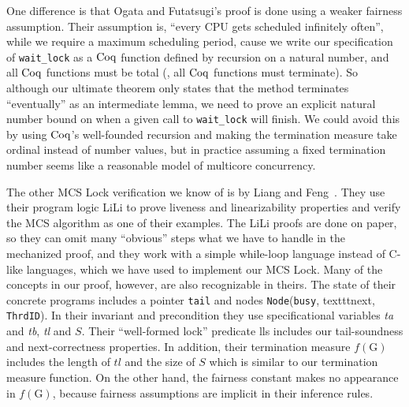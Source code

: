One difference is that Ogata and Futatsugi's proof is
done using a weaker fairness assumption.
Their assumption is, ``every CPU gets
scheduled infinitely often'', while we require a maximum scheduling
period,  cause we write our specification of \lstinline$wait_lock$ as a $\mathrm{Coq}$ function defined by recursion on a natural number, and all $\mathrm{Coq}$ functions must be total (\ie, all $\mathrm{Coq}$ functions must terminate). 
So although our ultimate theorem only states that the method
terminates ``eventually'' as an intermediate lemma, we need to prove an explicit natural number bound on when a given call to
\lstinline$wait_lock$ will finish.  
We could avoid this by using
$\mathrm{Coq}$'s well-founded recursion and
making the termination measure take ordinal instead of number
values, but in practice assuming a fixed termination number seems like a reasonable
model of multicore concurrency.

The other MCS Lock verification we know of is by Liang and
Feng~\cite{lili16}. 
They use their program logic LiLi to prove
liveness and linearizability properties and verify the MCS algorithm
as one of their examples.  
The LiLi proofs are done on paper, so they
can omit many ``obvious'' steps what we have to handle in the mechanized proof, 
and they work with a simple
while-loop language instead of C-like languages, which we have used to implement our MCS Lock.
Many of the concepts in our proof, however, 
are also recognizable in theirs. 
The state of their concrete
  programs includes a pointer \texttt{tail} and nodes
 \texttt{Node}(\texttt{busy}, texttt{next}, \texttt{ThrdID}).
In their invariant and precondition they use specificational variables
\textit{ta} and \textit{tb}, \textit{tl} and $S$. Their
  ``well-formed lock'' predicate \textsf{lls} includes our
  tail-soundness and next-correctness properties.
In addition, their
termination measure $f(\mathrm{G})$ includes the length of
$\mathit{tl}$ and the size of $S$ which is similar to our termination measure function. 
On the other hand, the fairness
constant makes no appearance in $f(\mathrm{G})$, because fairness
assumptions are implicit in their inference rules.


